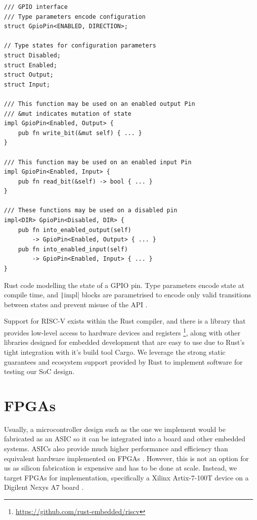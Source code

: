\begin{listing}[h!]
    \vspace{0.5cm}
    \begin{verbatim}
/// GPIO interface
/// Type parameters encode configuration
struct GpioPin<ENABLED, DIRECTION>;

// Type states for configuration parameters
struct Disabled;
struct Enabled;
struct Output;
struct Input;

/// This function may be used on an enabled output Pin
/// &mut indicates mutation of state
impl GpioPin<Enabled, Output> {
    pub fn write_bit(&mut self) { ... }
}

/// This function may be used on an enabled input Pin
impl GpioPin<Enabled, Input> {
    pub fn read_bit(&self) -> bool { ... }
}

/// These functions may be used on a disabled pin
impl<DIR> GpioPin<Disabled, DIR> {
    pub fn into_enabled_output(self) 
        -> GpioPin<Enabled, Output> { ... }
    pub fn into_enabled_input(self) 
        -> GpioPin<Enabled, Input> { ... }
}
    \end{verbatim}
    \caption{Rust code modelling the state of a GPIO pin. Type parameters encode state at compile time, and \texttt|impl| blocks are parametrised to encode only valid transitions between states and prevent misuse of the API \cite{embedded_rust}.}
    \label{lst:rust_gpio}
\end{listing}

Support for RISC-V exists within the Rust compiler, and there is a  library that provides low-level access to hardware devices and registers \footnote{\url{https://github.com/rust-embedded/riscv}}, along with other libraries designed for embedded development that are easy to use due to Rust's tight integration with it's build tool Cargo. We leverage the strong static guarantees and ecosystem support provided by Rust to implement software for testing our SoC design.

\section{FPGAs}

Usually, a microcontroller design such as the one we implement would be fabricated as an ASIC so it can be integrated into a board and other embedded systems. ASICs also provide much higher performance and efficiency than equivalent hardware implemented on FPGAs \cite{fpga_v_asic}. However, this is not an option for us as silicon fabrication is expensive and has to be done at scale. Instead, we target FPGAs for implementation, specifically a Xilinx Artix-7-100T device on a Digilent Nexys A7 board \cite{digilent}.

